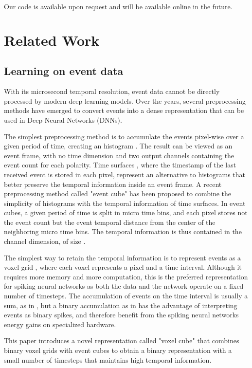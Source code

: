 \documentclass[conference]{IEEEtran}
\begin{document}
Our code is available upon request and will be available online in the future.

\section{Related Work}
\subsection{Learning on event data}
With its microsecond temporal resolution, event data cannot be directly processed by modern deep learning models. Over the years, several preprocessing methods have emerged to convert events into a dense representation that can be used in Deep Neural Networks (DNNs).

The simplest preprocessing method is to accumulate the events pixel-wise over a given period of time, creating an histogram \cite{steering2018}. The result can be viewed as an event frame, with no time dimension and two output channels containing the event count for each polarity. Time surfaces \cite{hots}, where the timestamp of the last received event is stored in each pixel, represent an alternative to histograms that better preserve the temporal information inside an event frame. A recent preprocessing method called "event cube" \cite{eventcube} has been proposed to combine the simplicity of histograms with the temporal information of time surfaces. In event cubes, a given period of time is split in  micro time bins, and each pixel stores not the event count but the event temporal distance from the center of the neighboring micro time bins. The temporal information is thus contained in the channel dimension, of size .

The simplest way to retain the temporal information is to represent events as a voxel grid \cite{voxel}, where each voxel represents a pixel and a time interval. Although it requires more memory and more computation, this is the preferred representation for spiking neural networks as both the data and the network operate on a fixed number of timesteps. The accumulation of events on the time interval is usually a sum, as in \cite{plif}, but a binary accumulation as in \cite{loicijcnn} has the advantage of interpreting events as binary spikes, and therefore benefit from the spiking neural networks energy gains on specialized hardware. 

This paper introduces a novel representation called "voxel cube" that combines binary voxel grids with event cubes to obtain a binary representation with a small number of timesteps that maintains high temporal information.
\end{document}
